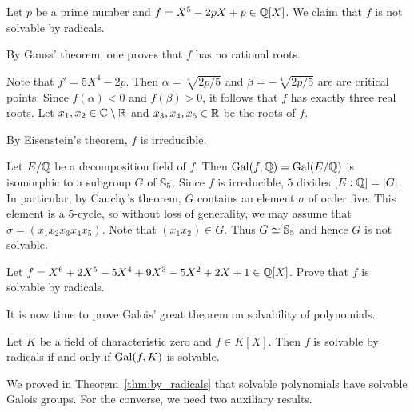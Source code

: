 \begin{example}
    Let $p$ be a prime number and $f=X^5-2pX+p\in\mathbb{Q}[X]$. 
    We claim that 
    $f$ is not solvable by radicals. 
    
    By Gauss' theorem, one proves that $f$ has no rational roots. 

    Note that $f'=5X^4-2p$. Then $\alpha=\sqrt[4]{2p/5}$ and $\beta=-\sqrt[4]{2p/5}$ are
    are critical points. Since $f(\alpha)<0$ and $f(\beta)>0$, it follows that $f$ has
    exactly three real roots. Let 
    $x_1,x_2\in\mathbb{C}\setminus\mathbb{R}$ and $x_3,x_4,x_5\in\mathbb{R}$ be the roots
    of $f$. 
    
    By Eisenstein's theorem, $f$ is irreducible. 
    
    Let $E/\mathbb{Q}$ be a decomposition field of $f$. 
    Then $\operatorname{Gal}(f,\mathbb{Q})=\operatorname{Gal}(E/\mathbb{Q})$ is isomorphic 
    to a subgroup $G$ of $\mathbb{S}_5$.
    Since 
    $f$ is irreducible, $5$ divides $[E:\mathbb{Q}]=|G|$. In particular, 
    by Cauchy's theorem, $G$ contains an element $\sigma$ of order five. This element
    is a 5-cycle, so without loss of generality, we may assume that 
    $\sigma=(x_1x_2x_3x_4x_5)$. Note that 
    $(x_1x_2)\in G$. Thus $G\simeq\mathbb{S}_5$ and hence
    $G$ is not solvable. 
\end{example}

\begin{exercise}
    Let $f=X^6+2X^5-5X^4+9X^3-5X^2+2X+1\in\mathbb{Q}[X]$. 
    Prove that $f$ is solvable by radicals. 
\end{exercise}



It is now time to prove Galois' great theorem on solvability 
of polynomials. 

\begin{theorem}[Galois]
\label{thm:Galois_great}
    Let $K$ be a field of characteristic zero and $f\in K[X]$. 
    Then $f$ is solvable by radicals if and only if $\operatorname{Gal}(f,K)$ is solvable. 
\end{theorem}

We proved in Theorem~\ref{thm:by_radicals} that solvable 
polynomials have solvable Galois groups. 
For the converse, we need two auxiliary results. 

